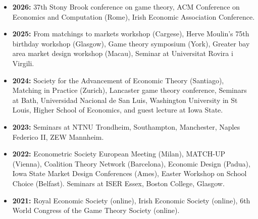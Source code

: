 \documentclass[11pt,a4paper]{article}
\begin{document}
\begin{itemize}[leftmargin=0pt,partopsep=0pt,topsep=0pt,parsep=0pt]
	\item[] \textbf{2026:} 37th Stony Brook conference on game theory, ACM Conference on Economics and Computation (Rome), Irish Economic Association Conference. 
	
	\item[]  \textbf{2025:} From matchings to markets workshop (Cargese), Herve Moulin's 75th birthday workshop (Glasgow), Game theory symposium (York), Greater bay area market design workshop (Macau), Seminar at Universitat Rovira i Virgili.
	
	\item[] \textbf{2024:} Society for the Advancement of Economic Theory (Santiago), Matching in Practice (Zurich), Lancaster game theory conference, Seminars at Bath, Universidad Nacional de San Luis, Washington University in St Louis, Higher School of Economics, and guest lecture at Iowa State.
	
	\item[] \textbf{2023:} Seminars at NTNU Trondheim, Southampton, Manchester, Naples Federico II, ZEW Mannheim.
	
	\item[] \textbf{2022:} Econometric Society European Meeting (Milan), MATCH-UP (Vienna), Coalition Theory Network (Barcelona), Economic Design (Padua), Iowa State Market Design Conferences (Ames), Easter Workshop on School Choice (Belfast). Seminars at ISER Essex, Boston College, Glasgow.
	
	\item[] \textbf{2021:} Royal Economic Society (online), Irish Economic Society (online), 6th World Congress of the Game Theory Society (online).
	
	
	
	
	
\end{itemize}
\end{document}
